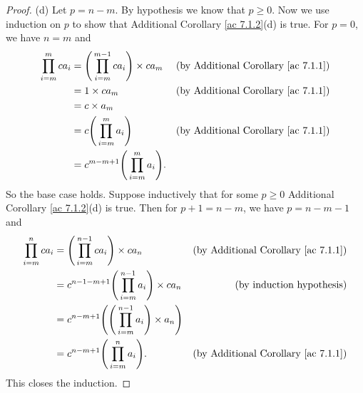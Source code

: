 \begin{proof}{(d)}
    Let \(p = n - m\).
    By hypothesis we know that \(p \geq 0\).
    Now we use induction on \(p\) to show that Additional Corollary \ref{ac 7.1.2}(d) is true.
    For \(p = 0\), we have \(n = m\) and
    \begin{align*}
        \prod_{i = m}^m ca_i & = \Bigg(\prod_{i = m}^{m - 1} ca_i\Bigg) \times ca_m & \text{(by Additional Corollary \ref{ac 7.1.1})} \\
                             & = 1 \times ca_m                                      & \text{(by Additional Corollary \ref{ac 7.1.1})} \\
                             & = c \times a_m                                                                                         \\
                             & = c \Bigg(\prod_{i = m}^m a_i\Bigg)                  & \text{(by Additional Corollary \ref{ac 7.1.1})} \\
                             & = c^{m - m + 1} \Bigg(\prod_{i = m}^m a_i\Bigg).
    \end{align*}
    So the base case holds.
    Suppose inductively that for some \(p \geq 0\) Additional Corollary \ref{ac 7.1.2}(d) is true.
    Then for \(p + 1 = n - m\), we have \(p = n - m - 1\) and
    \begin{align*}
        \prod_{i = m}^n ca_i & = \Bigg(\prod_{i = m}^{n - 1} ca_i\Bigg) \times ca_n                         & \text{(by Additional Corollary \ref{ac 7.1.1})} \\
                             & = c^{n - 1 - m + 1} \Bigg(\prod_{i = m}^{n - 1} a_i\Bigg) \times ca_n        & \text{(by induction hypothesis)}                \\
                             & = c^{n - m + 1} \Bigg(\Bigg(\prod_{i = m}^{n - 1} a_i\Bigg) \times a_n\Bigg)                                                   \\
                             & = c^{n - m + 1} \Bigg(\prod_{i = m}^n a_i\Bigg).                             & \text{(by Additional Corollary \ref{ac 7.1.1})}
    \end{align*}
    This closes the induction.
\end{proof}

